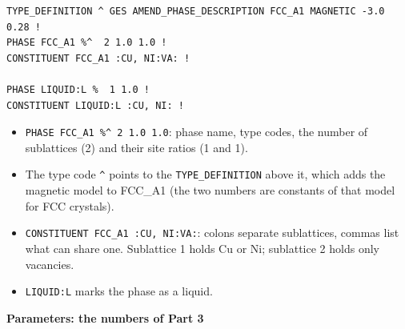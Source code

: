 \documentclass[12pt,a4paper]{article}
\begin{document}
\begin{lstlisting}[basicstyle={\footnotesize\ttfamily}]
TYPE_DEFINITION ^ GES AMEND_PHASE_DESCRIPTION FCC_A1 MAGNETIC -3.0 0.28 !
PHASE FCC_A1 %^  2 1.0 1.0 !
CONSTITUENT FCC_A1 :CU, NI:VA: !

PHASE LIQUID:L %  1 1.0 !
CONSTITUENT LIQUID:L :CU, NI: !
\end{lstlisting}
\begin{itemize}
\item \texttt{PHASE FCC\_\allowbreak{}A1 \%\textasciicircum{} 2 1.\allowbreak{}0 1.\allowbreak{}0}: phase name, type codes, the number of sublattices (2) and their site ratios (1 and 1).
\item The type code \texttt{\textasciicircum{}} points to the \texttt{TYPE\_\allowbreak{}DEFINITION} above it, which adds the magnetic model to FCC\_A1 (the two numbers are constants of that model for FCC crystals).
\item \texttt{CONSTITUENT FCC\_\allowbreak{}A1 :CU,\allowbreak{} NI:VA:}: colons separate sublattices, commas list what can share one. Sublattice 1 holds Cu or Ni; sublattice 2 holds only vacancies.
\item \texttt{LIQUID:L} marks the phase as a liquid.
\end{itemize}
\textbf{Parameters: the numbers of Part 3}
\end{document}

